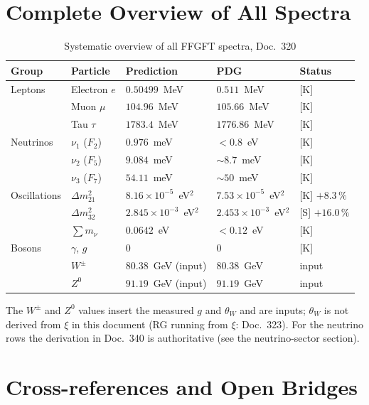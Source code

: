 \section{Complete Overview of All Spectra}

\begin{table}[h!]
\centering
\caption{Systematic overview of all FFGFT spectra, Doc.~320}
\label{tab:overview}
\begin{tabular}{lllll}
\toprule
\textbf{Group} & \textbf{Particle} & \textbf{Prediction} &
  \textbf{PDG} & \textbf{Status} \\
\midrule
Leptons
  & Electron $e$  & $0.50499$~MeV   & $0.511$~MeV   & [K] \\
  & Muon $\mu$    & $104.96$~MeV  & $105.66$~MeV  & [K] \\
  & Tau $\tau$    & $1783.4$~MeV  & $1776.86$~MeV & [K] \\
\midrule
Neutrinos
  & $\nu_1$ ($F_2$) & $0.976$~meV  & $<0.8$~eV     & [K] \\
  & $\nu_2$ ($F_5$) & $9.084$~meV  & $\sim8.7$~meV & [K] \\
  & $\nu_3$ ($F_7$) & $54.11$~meV  & $\sim50$~meV  & [K] \\
\midrule
Oscillations
  & $\Delta m_{21}^2$
    & $8.16\times10^{-5}$~eV$^2$ & $7.53\times10^{-5}$~eV$^2$
    & [K] $+8.3\,\%$ \\
  & $\Delta m_{32}^2$
    & $2.845\times10^{-3}$~eV$^2$ & $2.453\times10^{-3}$~eV$^2$
    & [S] $+16.0\,\%$ \\
  & $\sum m_\nu$ & $0.0642$~eV & $<0.12$~eV & [K] \\
\midrule
Bosons
  & $\gamma$, $g$ & $0$ & $0$ & [K] \\
  & $W^\pm$       & $80.38$~GeV (input) & $80.38$~GeV & input \\
  & $Z^0$         & $91.19$~GeV (input) & $91.19$~GeV & input \\
\bottomrule
\end{tabular}
\end{table}
\noindent The $W^\pm$ and $Z^0$ values insert the measured $g$ and
$\theta_W$ and are inputs; $\theta_W$ is not derived from $\xi$ in this
document (RG running from $\xi$: Doc.~323). For the neutrino rows the
derivation in Doc.~340 is authoritative (see the neutrino-sector section).

\section{Cross-references and Open Bridges}

